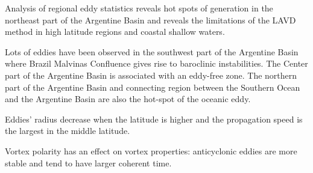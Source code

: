 Analysis of regional eddy statistics reveals hot spots of generation in the northeast part of the Argentine Basin and reveals the limitations of the LAVD method in high latitude regions and coastal shallow waters.

Lots of eddies have been observed in the southwest part of the Argentine Basin where Brazil Malvinas Confluence gives rise to baroclinic instabilities. The Center part of the Argentine Basin is associated with an eddy-free zone. The northern part of the Argentine Basin and connecting region between the Southern Ocean and the Argentine Basin are also the hot-spot of the oceanic eddy.

Eddies' radius decrease when the latitude is higher and the propagation speed is the largest in the middle latitude.

Vortex polarity has an effect on vortex properties: anticyclonic eddies are more stable and tend to have larger coherent time.





